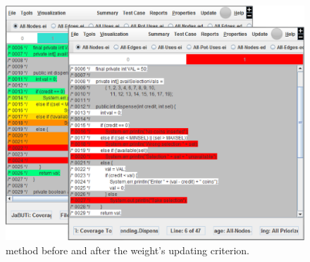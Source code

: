 
\begin{figure}[!ht]
\begin{center}
\includegraphics[height=0.40\textheight]{fig/dispenser-source-edited.eps}
\caption{\label{fig:source-input1} 
method before and after the weight's updating \wrt
{} criterion.}
\end{center}
\end{figure}
